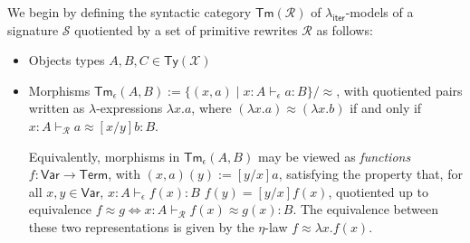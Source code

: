 \documentclass[acmsmall,screen,anonymous,review]{acmart}
\newcommand{\mc}[1]{\ensuremath{\mathcal{#1}}}
\newcommand{\ms}[1]{\ensuremath{\mathsf{#1}}}
\newcommand{\hasty}[4]{#1 \vdash_{#2} #3: {#4}}
\newcommand{\teqv}{\approx}
\newcommand{\tmeq}[5]{#1 \vdash_{#2} #3 \teqv #4 : {#5}}
\newcommand{\subiterexp}{\texorpdfstring{\(\lambda_{\ms{iter}}\)}{lambda-iter}}
\begin{document}
We begin by defining the syntactic category $\ms{Tm}(\mc{R})$ of \subiterexp{}-models of a signature
$\mc{S}$ quotiented by a set of primitive rewrites $\mc{R}$ as follows:
\begin{itemize}
  \item Objects types $A, B, C \in \ms{Ty}(\mc{X})$
  \item Morphisms $\ms{Tm}_\epsilon(A, B) := \{(x, a) \mid \hasty{x : A}{\epsilon}{a}{B}\} /
  \approx$, with quotiented pairs written as $\lambda$-expressions $\lambda x . a$, where $(\lambda
  x . a) \approx (\lambda x . b)$ if and only if $\tmeq{x : A}{\mc{R}}{a}{[x/y]b}{B}$. 

  Equivalently, morphisms in $\ms{Tm}_\epsilon(A, B)$ may be viewed as \emph{functions} $f :
  \ms{Var} \to \ms{Term}$, with $(x, a)(y) := [y/x]a$, satisfying the property that, for all $x, y
  \in \ms{Var}$, $\hasty{x : A}{\epsilon}{f(x)}{B}$ $f(y) = [y/x]f(x)$, quotiented up to equivalence
  $f \approx g \iff \tmeq{x : A}{\mc{R}}{f(x)}{g(x)}{B}$. The equivalence between these two
  representations is given by the $\eta$-law $f \approx \lambda x. f(x)$.


\end{itemize}
\end{document}
